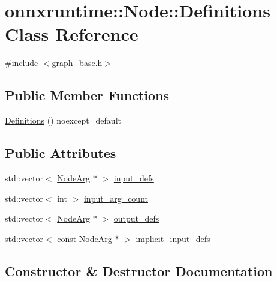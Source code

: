 \hypertarget{classonnxruntime_1_1Node_1_1Definitions}{}\section{onnxruntime\+:\+:Node\+:\+:Definitions Class Reference}
\label{classonnxruntime_1_1Node_1_1Definitions}


{\ttfamily \#include $<$graph\+\_\+base.\+h$>$}

\subsection*{Public Member Functions}
\begin{DoxyCompactItemize}
\item 
\mbox{\hyperlink{classonnxruntime_1_1Node_1_1Definitions_a2e8711eacbb9a9f7b83fecc0f20a54d6}{Definitions}} () noexcept=default
\end{DoxyCompactItemize}
\subsection*{Public Attributes}
\begin{DoxyCompactItemize}
\item 
std\+::vector$<$ \mbox{\hyperlink{classonnxruntime_1_1NodeArg}{Node\+Arg}} $\ast$ $>$ \mbox{\hyperlink{classonnxruntime_1_1Node_1_1Definitions_ab512b872154564e7a66dac136ba4970b}{input\+\_\+defs}}
\item 
std\+::vector$<$ int $>$ \mbox{\hyperlink{classonnxruntime_1_1Node_1_1Definitions_a3c9eaa50a5b4a62ab5393c82ca9c8cc0}{input\+\_\+arg\+\_\+count}}
\item 
std\+::vector$<$ \mbox{\hyperlink{classonnxruntime_1_1NodeArg}{Node\+Arg}} $\ast$ $>$ \mbox{\hyperlink{classonnxruntime_1_1Node_1_1Definitions_a433708d9d4d85092394b54c4ffcc6258}{output\+\_\+defs}}
\item 
std\+::vector$<$ const \mbox{\hyperlink{classonnxruntime_1_1NodeArg}{Node\+Arg}} $\ast$ $>$ \mbox{\hyperlink{classonnxruntime_1_1Node_1_1Definitions_a10d8bcaeab270dd5121b95fafc9d530d}{implicit\+\_\+input\+\_\+defs}}
\end{DoxyCompactItemize}


\subsection{Constructor \& Destructor Documentation}
\mbox{\label{classonnxruntime_1_1Node_1_1Definitions_a2e8711eacbb9a9f7b83fecc0f20a54d6}} 
